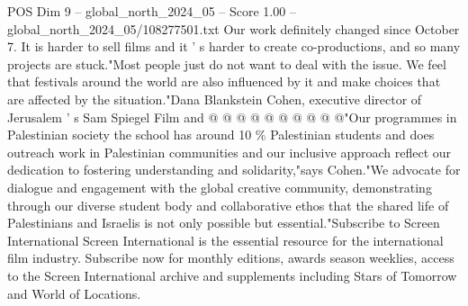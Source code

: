 \begin{textsample}{POS Dim 9 – global\_north\_2024\_05 – Score 1.00 – global\_north\_2024\_05/108277501.txt}
Our work definitely changed since October 7.
It is harder to sell films and it ' s harder to create co-productions, and so many projects are stuck."Most people just do not want to deal with the issue.
We feel that festivals around the world are also influenced by it and make choices that are affected by the situation."Dana Blankstein Cohen, executive director of Jerusalem ' s Sam Spiegel Film and @ @ @ @ @ @ @ @ @ @"Our programmes in Palestinian society the school has around 10 \% Palestinian students and does outreach work in Palestinian communities and our inclusive approach reflect our dedication to fostering understanding and solidarity,"says Cohen."We advocate for dialogue and engagement with the global creative community, demonstrating through our diverse student body and collaborative ethos that the shared life of Palestinians and Israelis is not only possible but essential."Subscribe to Screen International Screen International is the essential resource for the international film industry.
Subscribe now for monthly editions, awards season weeklies, access to the Screen International archive and supplements including Stars of Tomorrow and World of Locations.

\end{textsample}
